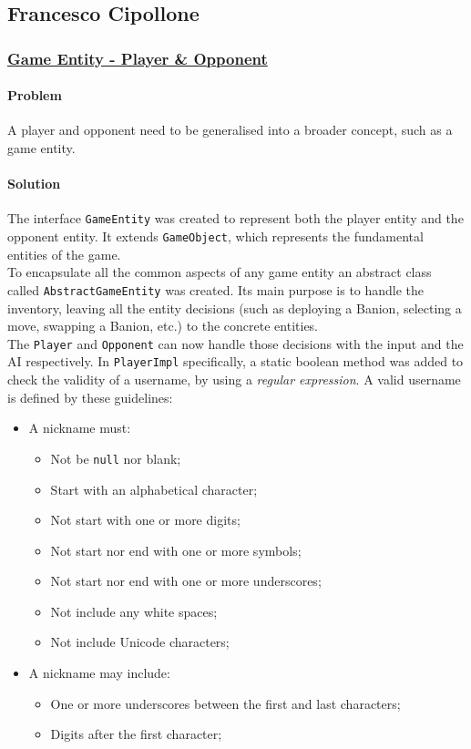 \documentclass[12pt, a4paper]{report}
\theoremstyle{definition}
\begin{document}
    \pagebreak

    \subsection*{Francesco Cipollone}

    \subsubsection{\underline{Game Entity - Player \& Opponent}}
    \paragraph{Problem}
    A player and opponent need to be generalised into a broader concept, such as a game entity.
    \paragraph{Solution}
    The interface \verb|GameEntity| was created to represent both the player entity and the opponent entity.
    It extends \verb|GameObject|, which represents the fundamental entities of the game.\\
    To encapsulate all the common aspects of any game entity an abstract class called \verb|AbstractGameEntity| was created. Its main purpose is to handle the inventory, leaving all the
    entity decisions (such as deploying a Banion, selecting a move, swapping a Banion, etc.) to the concrete entities.\\
    The \verb|Player| and \verb|Opponent| can now handle those decisions with the input and the AI respectively.
    In \verb|PlayerImpl| specifically, a static boolean method was added to check the validity of a username, by using a \textit{regular expression}.
    A valid username is defined by these guidelines:

    \begin{itemize}
        \item A nickname must:
        \begin{itemize}
            \item Not be \verb|null| nor blank;
            \item Start with an alphabetical character;
            \item Not start with one or more digits;
            \item Not start nor end with one or more symbols;
            \item Not start nor end with one or more underscores;
            \item Not include any white spaces;
            \item Not include Unicode characters;
        \end{itemize}
        \item A nickname may include:
        \begin{itemize}
            \item One or more underscores between the first and last characters;
            \item Digits after the first character;
        \end{itemize}
    \end{itemize}
\end{document}
